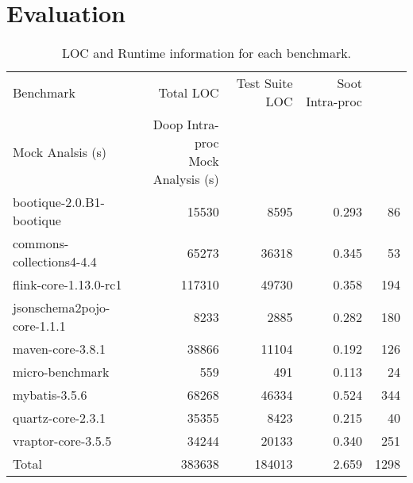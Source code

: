 \section{Evaluation}
\label{sec:evaluation}

\begin{table*}[b]
	\centering
	\caption{LOC and Runtime information for each benchmark.}
	\begin{tabular}{lrrrr}
		\toprule
		Benchmark & Total LOC & Test Suite LOC & Soot Intra-proc \\ Mock Analsis (s)  & \thead{Doop Intra-proc \\ Mock Analysis (s)} \\
		\midrule
		bootique-2.0.B1-bootique           		&  15530   & 8595   &  0.293   & 86    \\
		commons-collections4-4.4           		&  65273   & 36318  &  0.345   & 53        \\
		flink-core-1.13.0-rc1           		&  117310  & 49730  &  0.358   & 194        \\
		jsonschema2pojo-core-1.1.1         		&  8233    & 2885   &  0.282   & 180       \\
		maven-core-3.8.1   		           		&  38866   & 11104  &  0.192   & 126        \\
		micro-benchmark         		  		&  559     & 491	&  0.113   & 24        \\
		mybatis-3.5.6         		  			&  68268   & 46334  &  0.524   & 344        \\
		quartz-core-2.3.1        	  			&  35355   & 8423   &  0.215   & 40      \\
		vraptor-core-3.5.5         	  			&  34244   & 20133  &  0.340   & 251      \\
		\bottomrule
		Total         	  						&  383638  & 184013 &  2.659   & 1298      \\
	\end{tabular}
	\label{tab:runtimes}
\end{table*}

